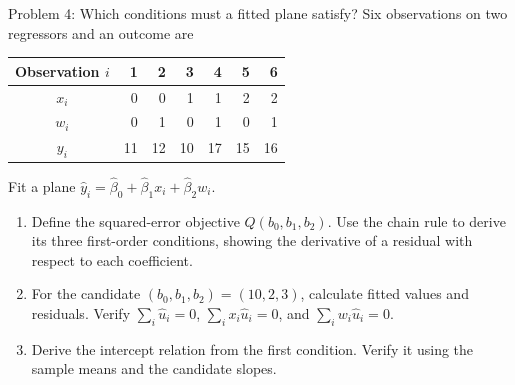 \documentclass[notes,10pt, aspectratio=169]{beamer}
\begin{document}
\begin{frame}{Problem 4: Which conditions must a fitted plane satisfy?}
Six observations on two regressors and an outcome are
\begin{center}
\begin{tabular}{c|rrrrrr}
Observation $i$ & 1 & 2 & 3 & 4 & 5 & 6 \\ \hline
$x_i$ & 0 & 0 & 1 & 1 & 2 & 2 \\
$w_i$ & 0 & 1 & 0 & 1 & 0 & 1 \\
$y_i$ & 11 & 12 & 10 & 17 & 15 & 16
\end{tabular}
\end{center}
Fit a plane $\widehat y_i=\widehat\beta_0+\widehat\beta_1x_i+\widehat\beta_2w_i$.
\begin{enumerate}
\setlength{\itemsep}{7pt}
\item Define the squared-error objective $Q(b_0,b_1,b_2)$. Use the chain rule to derive its three first-order conditions, showing the derivative of a residual with respect to each coefficient.
\item For the candidate $(b_0,b_1,b_2)=(10,2,3)$, calculate fitted values and residuals. Verify $\sum_i\widehat u_i=0$, $\sum_ix_i\widehat u_i=0$, and $\sum_iw_i\widehat u_i=0$.
\item Derive the intercept relation from the first condition. Verify it using the sample means and the candidate slopes.
\end{enumerate}
\end{frame}
\end{document}
